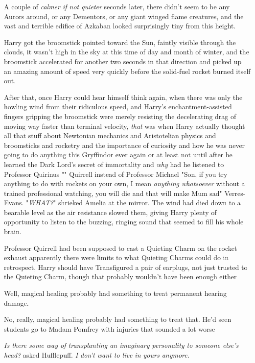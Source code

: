 A couple of \emph{calmer if not quieter} seconds later, there didn't seem to be
any Aurors around, or any Dementors, or any giant winged flame creatures, and
the vast and terrible edifice of Azkaban looked surprisingly tiny from this
height.

Harry got the broomstick pointed toward the Sun, faintly visible through the
clouds, it wasn't high in the sky at this time of day and month of winter, and
the broomstick accelerated for another two seconds in that direction and picked
up an amazing amount of speed very quickly before the solid-fuel rocket burned
itself out.

After that, once Harry could hear himself think again, when there was only the
howling wind from their ridiculous speed, and Harry's enchantment-assisted
fingers gripping the broomstick were merely resisting the decelerating drag of
moving way faster than terminal velocity, \emph{that} was when Harry actually
thought all that stuff about Newtonian mechanics and Aristotelian physics and
broomsticks and rocketry and the importance of curiosity and how he was never
going to do anything this Gryffindor ever again or at least not until after he
learned the Dark Lord's secret of immortality and \emph{why} had he listened to
Professor Quirinus "" Quirrell instead of Professor Michael
"Son, if you try anything to do with rockets on your own, I mean \emph{anything
whatsoever} without a trained professional watching, you will die and that will
make Mum sad" Verres-Evans.
\sbreak
"\emph{WHAT?}" shrieked Amelia at the mirror.
\sbreak
The wind had died down to a bearable level as the air resistance slowed them,
giving Harry plenty of opportunity to listen to the buzzing, ringing sound that
seemed to fill his whole brain.

Professor Quirrell had been supposed to cast a Quieting Charm on the rocket
exhaust{\el} apparently there were limits to what Quieting Charms could
do{\el} in retrospect, Harry should have Transfigured a pair of earplugs,
not just trusted to the Quieting Charm, though that probably wouldn't have been
enough either{\el}

Well, magical healing probably had something to treat permanent hearing damage.

No, really, magical healing probably had something to treat that. He'd seen
students go to Madam Pomfrey with injuries that sounded a lot worse{\el}

\emph{Is there some way of transplanting an imaginary personality to someone
else's head?} asked Hufflepuff. \emph{I don't want to live in yours anymore.}

